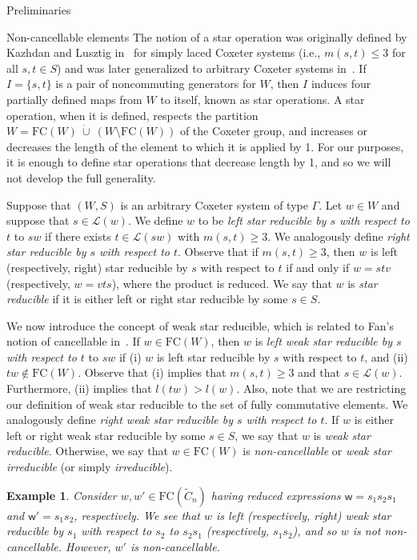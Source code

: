 \documentclass[12pt]{amsart}
\newtheorem{ex}[thm]{Example}
\newcommand{\C}{\widetilde{C}}
\renewcommand{\L}{\mathcal{L}}
\renewcommand{\(}{\left(}
\renewcommand{\)}{\right)}
\newcommand{\w}{\mathsf{w}}
\newcommand{\FC}{\mathrm{FC}}
\begin{document}
\begin{section}{Preliminaries}
\begin{subsection}{Non-cancellable elements}
The notion of a star operation was originally defined by Kazhdan and Lusztig in~\cite[]{Kazhdan.D;Lusztig.G:A} for simply laced Coxeter systems (i.e., $m(s,t)\leq3$ for all $s,t \in S$) and was later generalized to arbitrary Coxeter systems in~\cite[]{Lusztig.G:A}.  If $I=\{s,t\}$ is a pair of noncommuting generators for $W$, then $I$ induces four partially defined maps from $W$ to itself, known as star operations. A star operation, when it is defined, respects the partition $W = \FC(W)\ \dot{\cup}\  (W \setminus \FC(W) )$ of the Coxeter group, and increases or decreases the length of the element to which it is applied by 1.  For our purposes, it is enough to define star operations that decrease length by 1, and so we will not develop the full generality.

Suppose that $(W,S)$ is an arbitrary Coxeter system of type $\Gamma$.  Let $w \in W$ and suppose that $s \in \L(w)$.  We define $w$ to be \emph{left star reducible by $s$ with respect to $t$} to $sw$ if there exists $t \in \L(sw)$ with $m(s,t) \geq 3$.  We analogously define \emph{right star reducible by $s$ with respect to $t$}.  Observe that if $m(s,t)\geq 3$, then $w$ is left (respectively, right) star reducible by $s$ with respect to $t$ if and only if $w=stv$ (respectively, $w=vts$), where the product is reduced.  We say that $w$ is \emph{star reducible} if it is either left or right star reducible by some $s\in S$.

We now introduce the concept of weak star reducible, which is related to Fan's notion of cancellable in~\cite{Fan.C:A}.   If $w \in \FC(W)$, then $w$ is \emph{left weak star reducible by $s$ with respect to $t$} to $sw$ if (i) $w$ is left star reducible by $s$ with respect to $t$, and (ii) $tw \notin \FC(W)$.  Observe that (i) implies that $m(s,t) \geq 3$ and that $s \in \L(w)$.  Furthermore, (ii) implies that $l(tw)>l(w)$.  Also, note that we are restricting our definition of weak star reducible to the set of fully commutative elements.  We analogously define \emph{right weak star reducible by $s$ with respect to $t$}.  If $w$ is either left or right weak star reducible by some $s\in S$, we say that $w$ is \emph{weak star reducible}.  Otherwise, we say that $w\in \FC(W)$ is \emph{non-cancellable} or \emph{weak star irreducible} (or simply \emph{irreducible}).

\begin{ex}
Consider $w,w' \in \FC(\C_{n})$ having reduced expressions $\w=s_{1}s_{2}s_{1}$ and $\w'=s_{1}s_{2}$, respectively.  We see that $w$ is left (respectively, right) weak star reducible by $s_{1}$ with respect to $s_{2}$ to $s_2 s_1$ (respectively, $s_1 s_2$), and so $w$ is not non-cancellable.  However, $w'$ is non-cancellable.
\end{ex}    


\end{subsection}
\end{section}
\end{document}
